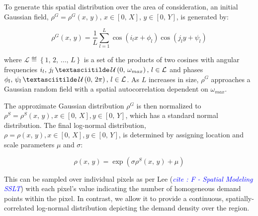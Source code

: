 \documentclass[12pt,onecolumn]{IEEEtran}
\begin{document}
To generate this spatial distribution over the area of consideration, an initial Gaussian field, $\rho^G = \rho^G\left(x,\, y\right),\, x \in \left[0,\, X\right],\, y \in \left[0,\, Y\right]$, is generated by:

\begin{equation}
\rho^G\left(x,\, y\right)=\frac{1}{L}\sum_{l=1}^L \cos\left(i_lx+\phi_l\right) \cos\left(j_ly+\psi_l\right)
\end{equation}

\noindent \sloppy where $\mathcal{L} \eqdef \left\{1,\, 2,\, \ldots,\, L\right\}$ is a set of the products of two cosines with angular frequencies $i_l,\, j_l\, \textasciitilde\, \mathcal{U}\left(0,\, \omega_{max}\right),\, l \in \mathcal{L}$ and phases $\phi_l,\, \psi_l\, \textasciitilde\, \mathcal{U}\left(0,\, 2\pi\right),\, l \in \mathcal{L}$.  As $L$ increases in size, $\rho^G$ approaches a Gaussian random field with a spatial autocorrelation dependent on $\omega_{max}$.

The approximate Gaussian distribution $\rho^G$ is then normalized to $\rho^S = \rho^S(x,\, y), x \in [0,\, X], y \in [0,\, Y]$, which has a standard normal distribution.  The final log-normal distribution, $\rho = \rho(x,\, y), x \in [0,\, X], y \in [0,\, Y]$, is determined by assigning location and scale parameters $\mu$ and $\sigma$:

\begin{equation}
\rho\left(x,\, y\right) = \exp\left(\sigma\rho^S\left(x,\, y\right)+\mu\right)
\end{equation}

This can be sampled over individual pixels as per Lee (\textit{\textcolor{blue}{cite : F - Spatial Modeling SSLT}}) with each pixel's value indicating the number of homogeneous demand points within the pixel.  In contrast, we allow it to provide a continuous, spatially-correlated log-normal distribution depicting the demand density over the region.

\end{document}
